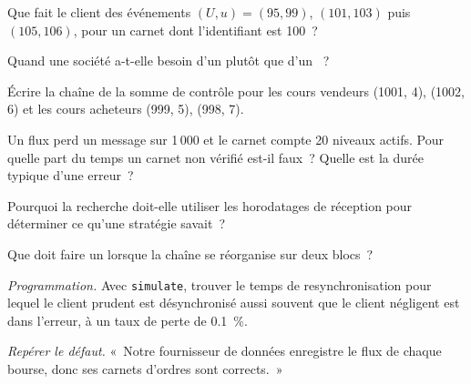 \begin{exercise}[$\star$]\label{exo:m3:crypto-data-and-infrastructure:1}
Que fait le client des événements $(U, u) = (95, 99)$, $(101, 103)$ puis $(105, 106)$, pour un carnet dont l'identifiant est 100~?
\end{exercise}

\begin{exercise}[$\star$]\label{exo:m3:crypto-data-and-infrastructure:2}
Quand une société a-t-elle besoin d'un  plutôt que d'un ~?
\end{exercise}

\begin{exercise}[$\star$]\label{exo:m3:crypto-data-and-infrastructure:3}
Écrire la chaîne de la somme de contrôle pour les cours vendeurs (1001, 4), (1002, 6) et les cours acheteurs (999, 5), (998, 7).
\end{exercise}

\begin{exercise}[$\star\star$]\label{exo:m3:crypto-data-and-infrastructure:4}
Un flux perd un message sur 1\,000 et le carnet compte 20 niveaux actifs. Pour quelle part du temps un carnet non vérifié est-il faux~? Quelle est la durée typique d'une erreur~?
\end{exercise}

\begin{exercise}[$\star\star$]\label{exo:m3:crypto-data-and-infrastructure:5}
Pourquoi la recherche doit-elle utiliser les horodatages de réception pour déterminer ce qu'une stratégie savait~?
\end{exercise}

\begin{exercise}[$\star\star$]\label{exo:m3:crypto-data-and-infrastructure:6}
Que doit faire un  lorsque la chaîne se réorganise sur deux blocs~?
\end{exercise}

\begin{exercise}[$\star\star\star$]\label{exo:m3:crypto-data-and-infrastructure:7}
\emph{Programmation.} Avec \texttt{simulate}, trouver le temps de resynchronisation pour lequel le client prudent est désynchronisé aussi souvent que le client négligent est dans l'erreur, à un taux de perte de
0.1~\%.
\end{exercise}

\begin{exercise}[$\star\star\star$]\label{exo:m3:crypto-data-and-infrastructure:8}
\emph{Repérer le défaut.} «~Notre fournisseur de données enregistre le flux de chaque bourse, donc ses carnets d'ordres sont corrects.~»
\end{exercise}

